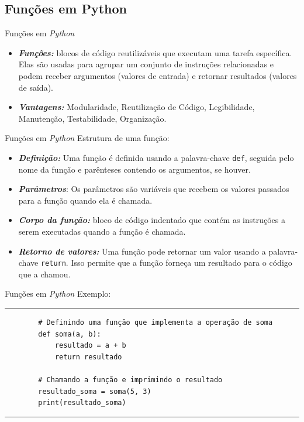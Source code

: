 \documentclass{beamer}
\begin{document}
\subsection{Funções em Python}
\begin{frame}{Funções em \textit{Python}}
	\begin{itemize}
		\item \textbf{\textit{Funções:}} blocos de código reutilizáveis que executam uma tarefa específica. Elas são usadas para agrupar um conjunto de instruções relacionadas e podem receber argumentos (valores de entrada) e retornar resultados (valores de saída).
		\item \textbf{\textit{Vantagens:}} Modularidade, Reutilização de Código, Legibilidade, Manutenção, Testabilidade, Organização.
	\end{itemize}
\end{frame}

\begin{frame}{Funções em \textit{Python}}
	Estrutura de uma função:
	\begin{itemize}
		\item \textbf{\textit{Definição:}} Uma função é definida usando a palavra-chave \texttt{def}, seguida pelo nome da função e parênteses contendo os argumentos, se houver.
		\item \textbf{\textit{Parâmetros}}: Os parâmetros são variáveis que recebem os valores passados para a função quando ela é chamada. 
		\item \textbf{\textit{Corpo da função:}} bloco de código indentado que contém as instruções a serem executadas quando a função é chamada. 
		\item \textbf{\textit{Retorno de valores:}} Uma função pode retornar um valor usando a palavra-chave \texttt{return}. Isso permite que a função forneça um resultado para o código que a chamou.
	\end{itemize}
\end{frame}


\begin{frame}[fragile]{Funções em \textit{Python}}
	Exemplo:
	\rule{\textwidth}{1pt}
	\scriptsize
	\begin{verbatim}
		# Definindo uma função que implementa a operação de soma
		def soma(a, b):
			resultado = a + b
			return resultado
		
		# Chamando a função e imprimindo o resultado
		resultado_soma = soma(5, 3)
		print(resultado_soma)
			\end{verbatim}
	\rule{\textwidth}{1pt}
\end{frame}
\end{document}
